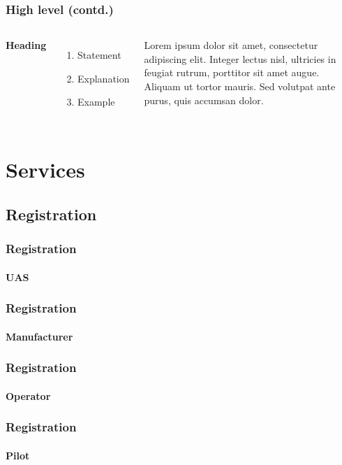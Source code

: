 \documentclass[usenames,dvipsnames,aspectratio=169,serif]{beamer}
\begin{document}

\begin{frame}
  \frametitle{High level (contd.)}
\begin{columns}[c] %

\textbf{Heading}
\begin{enumerate}
\item Statement
\item Explanation
\item Example
\end{enumerate}

Lorem ipsum dolor sit amet, consectetur adipiscing elit. Integer lectus nisl, ultricies in feugiat rutrum, porttitor sit amet augue. Aliquam ut tortor mauris. Sed volutpat ante purus, quis accumsan dolor.

\end{columns}
\end{frame}

\section{Services}

\subsection{Registration}
\begin{frame}
	\frametitle{Registration}
	\framesubtitle{UAS}
\end{frame}

\begin{frame}
	\frametitle{Registration}
	\framesubtitle{Manufacturer}
\end{frame}

\begin{frame}
	\frametitle{Registration}
	\framesubtitle{Operator}
\end{frame}

\begin{frame}
	\frametitle{Registration}
	\framesubtitle{Pilot}
\end{frame}

\end{document}
